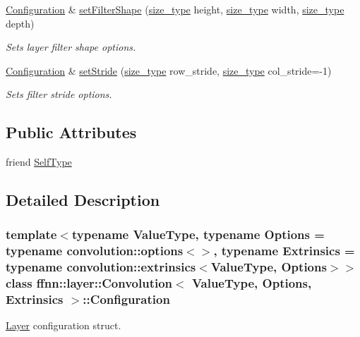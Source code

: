 \begin{DoxyCompactItemize}
\hyperlink{classffnn_1_1layer_1_1_convolution_1_1_configuration}{Configuration} \& \hyperlink{classffnn_1_1layer_1_1_convolution_1_1_configuration_acd6092bac8260ac9c9da4c11c09968d0}{set\-Filter\-Shape} (\hyperlink{namespaceffnn_a63b90a2fd70eb76684eac482a51633e5}{size\-\_\-type} height, \hyperlink{namespaceffnn_a63b90a2fd70eb76684eac482a51633e5}{size\-\_\-type} width, \hyperlink{namespaceffnn_a63b90a2fd70eb76684eac482a51633e5}{size\-\_\-type} depth)
\begin{DoxyCompactList}\small\item\em Sets layer filter shape options. \end{DoxyCompactList}\item 
\hyperlink{classffnn_1_1layer_1_1_convolution_1_1_configuration}{Configuration} \& \hyperlink{classffnn_1_1layer_1_1_convolution_1_1_configuration_af149ccc6dd80d25fefc22e57d5250c26}{set\-Stride} (\hyperlink{namespaceffnn_a63b90a2fd70eb76684eac482a51633e5}{size\-\_\-type} row\-\_\-stride, \hyperlink{namespaceffnn_a63b90a2fd70eb76684eac482a51633e5}{size\-\_\-type} col\-\_\-stride=-\/1)
\begin{DoxyCompactList}\small\item\em Sets filter stride options. \end{DoxyCompactList}\end{DoxyCompactItemize}
\subsection*{Public Attributes}
\begin{DoxyCompactItemize}
\item 
friend \hyperlink{classffnn_1_1layer_1_1_convolution_1_1_configuration_aa57a5c918311d302244afcfced552871}{Self\-Type}
\end{DoxyCompactItemize}


\subsection{Detailed Description}
\subsubsection*{template$<$typename Value\-Type, typename Options = typename convolution\-::options$<$$>$, typename Extrinsics = typename convolution\-::extrinsics$<$\-Value\-Type, Options$>$$>$class ffnn\-::layer\-::\-Convolution$<$ Value\-Type, Options, Extrinsics $>$\-::\-Configuration}

\hyperlink{classffnn_1_1layer_1_1_layer}{Layer} configuration struct. 

